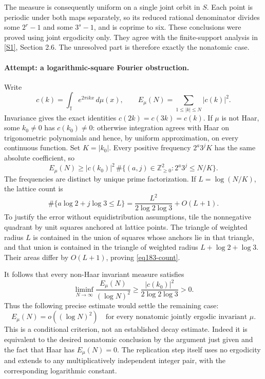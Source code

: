 \documentclass[11pt,a4paper]{article}
\newcommand{\Z}{\mathbb{Z}}
\newcommand{\sref}[2]{\hyperlink{source:#1:#2}{[S#2]}}
\numberwithin{equation}{section}
\begin{document}
The measure is consequently uniform on a single joint orbit in $S$. Each
point is periodic under both maps separately, so its reduced rational
denominator divides some $2^r-1$ and some $3^s-1$, and is coprime to six.
These conclusions were proved using joint ergodicity only. They agree
with the finite-support analysis in \sref{statement}{1}, Section 2.6. The
unresolved part is therefore exactly the nonatomic case.

\paragraph{Attempt: a logarithmic-square Fourier obstruction.}
Write
\[
 c(k)=\int_{\mathbb T}e^{2\pi ikx}\,d\mu(x),\qquad
 E_\mu(N)=\sum_{1\le |k|\le N}|c(k)|^2.
\]
Invariance gives the exact identities $c(2k)=c(3k)=c(k)$. If $\mu$ is not
Haar, some $k_0\ne0$ has $c(k_0)\ne0$: otherwise integration agrees with
Haar on trigonometric polynomials and hence, by uniform approximation,
on every continuous function. Set $K=|k_0|$. Every positive frequency $2^a3^jK$ has the same
absolute coefficient, so
\[
 E_\mu(N)\ge |c(k_0)|^2\,
       \#\{(a,j)\in\Z_{\ge0}^2:2^a3^j\le N/K\}.
\]
The frequencies are distinct by unique prime factorization. If
$L=\log(N/K)$, the lattice count is
\begin{equation}\label{eq183-count}
 \#\{a\log2+j\log3\le L\}
       =\frac{L^2}{2\log2\log3}+O(L+1).
\end{equation}
To justify the error without equidistribution assumptions, tile the
nonnegative quadrant by unit squares anchored at lattice points. The
triangle of weighted radius $L$ is contained in the union of squares
whose anchors lie in that triangle, and that union is contained in the
triangle of weighted radius $L+\log2+\log3$. Their areas differ by
$O(L+1)$, proving \eqref{eq183-count}.

It follows that every non-Haar invariant measure satisfies
\begin{equation}\label{eq183-lower}
 \liminf_{N\to\infty}\frac{E_\mu(N)}{(\log N)^2}
                 \ge\frac{|c(k_0)|^2}{2\log2\log3}>0.
\end{equation}
Thus the following precise estimate would settle the remaining case:
\begin{equation}\label{eq183-missing}
 E_\mu(N)=o((\log N)^2)
 \quad\text{for every nonatomic jointly ergodic invariant }\mu.
\end{equation}
This is a conditional criterion, not an established decay estimate.
Indeed it is equivalent to the desired nonatomic conclusion by the
argument just given and the fact that Haar has $E_\mu(N)=0$. The replication step
itself uses no ergodicity and extends to any multiplicatively independent
integer pair, with the corresponding logarithmic constant.
\end{document}
